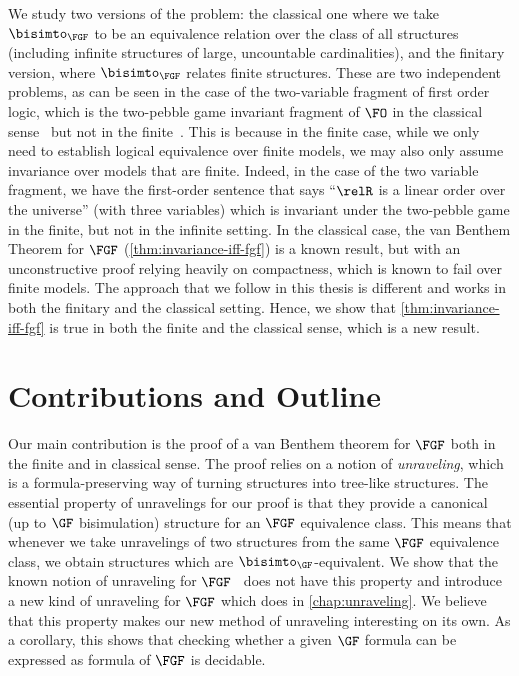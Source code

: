 We study two versions of the problem: the classical one where we take $\bisimto_{\FGF}$ to be an equivalence relation over the class of all structures (including infinite structures of large, uncountable cardinalities), and the finitary version, where $\bisimto_{\FGF}$ relates finite structures.
These are two independent problems, as can be seen in the case of the two-variable fragment of first order logic, which is the two-pebble game invariant fragment of $\FO$ in the classical sense~\cite{gradel1999} but not in the finite~\cite{otto2017}.
This is because in the finite case, while we only need to establish logical equivalence over finite models, we may also only assume invariance over models that are finite.
Indeed, in the case of the two variable fragment, we have the first-order sentence that says ``$\relR$ is a linear order over the universe'' (with three variables) which is invariant under the two-pebble game in the finite, but not in the infinite setting.
In the classical case, the van Benthem Theorem for $\FGF$ (\cref{thm:invariance-iff-fgf}) is a known result, but with an unconstructive proof relying heavily on compactness, which is known to fail over finite models.
The approach that we follow in this thesis is different and works in both the finitary and the classical setting.
Hence, we show that \cref{thm:invariance-iff-fgf} is true in both the finite and the classical sense, which is a new result.

\section{Contributions and Outline}

Our main contribution is the proof of a van Benthem theorem for $\FGF$ both in the finite and in classical sense.
The proof relies on a notion of \emph{unraveling}, which is a formula-preserving way of turning structures into tree-like structures.
The essential property of unravelings for our proof is that they provide a canonical (up to $\GF$ bisimulation) structure for an $\FGF$ equivalence class.
This means that whenever we take unravelings of two structures from the same $\FGF$ equivalence class, we obtain structures which are $\bisimto_{\GF}$-equivalent.
We show that the known notion of unraveling for $\FGF$~\cite{Bednarczyk21} does not have this property and introduce a new kind of unraveling for $\FGF$ which does in \cref{chap:unraveling}.
We believe that this property makes our new method of unraveling interesting on its own.
As a corollary, this shows that checking whether a given $\GF$ formula can be expressed as formula of $\FGF$ is decidable.

